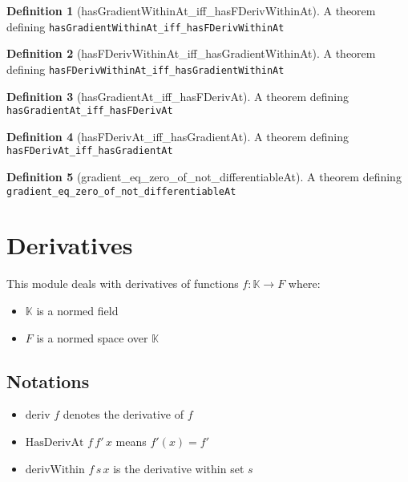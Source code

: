 \documentclass{article}
\theoremstyle{definition}
\newtheorem{definition}{Definition}
\begin{document}
\begin{definition}[hasGradientWithinAt_iff_hasFDerivWithinAt]
A theorem defining \texttt{hasGradientWithinAt_iff_hasFDerivWithinAt}
\end{definition}

\begin{definition}[hasFDerivWithinAt_iff_hasGradientWithinAt]
A theorem defining \texttt{hasFDerivWithinAt_iff_hasGradientWithinAt}
\end{definition}

\begin{definition}[hasGradientAt_iff_hasFDerivAt]
A theorem defining \texttt{hasGradientAt_iff_hasFDerivAt}
\end{definition}

\begin{definition}[hasFDerivAt_iff_hasGradientAt]
A theorem defining \texttt{hasFDerivAt_iff_hasGradientAt}
\end{definition}

\begin{definition}[gradient_eq_zero_of_not_differentiableAt]
A theorem defining \texttt{gradient_eq_zero_of_not_differentiableAt}
\end{definition}

\section{Derivatives}
This module deals with derivatives of functions $f : \mathbb{K} \to F$ where:
\begin{itemize}
\item $\mathbb{K}$ is a normed field
\item $F$ is a normed space over $\mathbb{K}$
\end{itemize}

\subsection{Notations}
\begin{itemize}
\item $\text{deriv } f$ denotes the derivative of $f$
\item $\text{HasDerivAt } f \, f' \, x$ means $f'(x) = f'$
\item $\text{derivWithin } f \, s \, x$ is the derivative within set $s$
\end{itemize}
\end{document}
